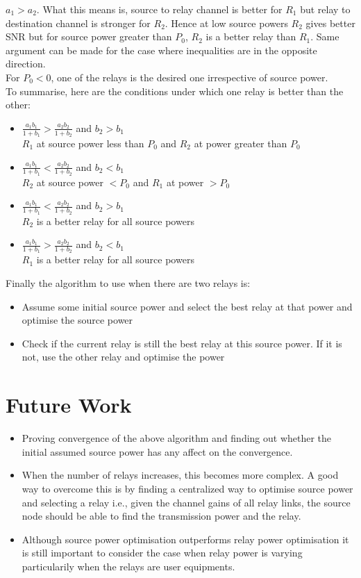 \documentclass[conference]{IEEEtran}
\begin{document}
$a_1 > a_2$. What this means is, source to relay channel is 
better for $R_1$ but relay to destination channel is stronger
for $R_2$. Hence at low source powers $R_2$ gives
better SNR but for  source power greater than  $P_0$, $R_2$ 
is a better relay than $R_1$. Same argument can be made 
for the case where inequalities are in the opposite
direction. 
\\
For $P_0 < 0$, one of the relays is the desired one irrespective of source power.
\\
To summarise, here are the conditions under which one relay is better than the other:
\begin{itemize}
	\item $\frac{a_1b_1}{1+b_1} >	\frac{a_2b_2}{1+b_2}$ and $b_2 > b_1$ \\
		$R_1$ at source power less than  $P_0$ and $R_2$ at power greater than $P_0$
	\item $\frac{a_1b_1}{1+b_1} < \frac{a_2b_2}{1+b_2}$ and $b_2 < b_1$ \\
		$R_2$ at source power $<P_0$ and $R_1$ at power $>P_0$
	\item $\frac{a_1b_1}{1+b_1} < \frac{a_2b_2}{1+b_2}$ and $b_2 > b_1$ \\
		$R_2$ is a better relay for all source powers
	\item $\frac{a_1b_1}{1+b_1} >	\frac{a_2b_2}{1+b_2}$ and $b_2 < b_1$ \\
		$R_1$ is a better relay for all source powers
\end{itemize}
Finally the algorithm to use when there are two relays is:
\begin{itemize}
	\item Assume some initial source power and select the best relay at that power and optimise the source power
	\item Check if the current relay is still the best relay at this source power. If it is	not, use the other relay and optimise the power
\end{itemize}
\section{Future Work}
\begin{itemize}
	\item Proving convergence of the above algorithm and finding out whether the
		initial assumed source power has any affect on the convergence.
	\item When the number of relays increases, this becomes more complex. A good 
		way to overcome this is by finding a centralized way to optimise 
		source power and selecting a relay i.e., given the channel gains of all relay
		links, the source node should be able to find the transmission power and 
		the relay.
	\item Although source power optimisation outperforms relay power optimisation
		it is still important to consider the case when relay power is varying
		particularily when the relays are user equipments.

\end{itemize}
\end{document}
